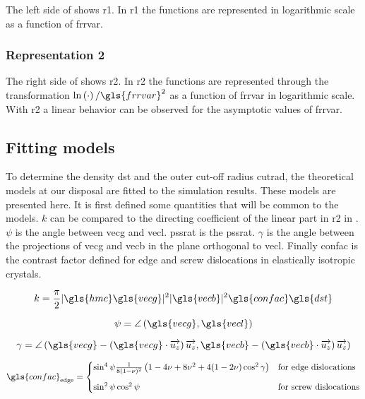 The left side of  shows \gls{r1}.
In \gls{r1} the functions are represented in logarithmic scale as a function of \gls{frrvar}.

\subsubsection{Representation 2}\label{sec:representation-2}

The right side of  shows \gls{r2}.
In \gls{r2} the functions are represented through the transformation \( \ln\left( \cdot \right) / \gls{frrvar}^2 \) as a function of \gls{frrvar} in logarithmic scale.
With \gls{r2} a linear behavior can be observed for the asymptotic values of \gls{frrvar}.

\subsection{Fitting models}

To determine the density \gls{dst} and the outer cut-off radius \gls{cutrad}, the theoretical models at our disposal are fitted to the simulation results.
These models are presented here.
It is first defined some quantities that will be common to the models.
\( k \) can be compared to the directing coefficient of the linear part in \gls{r2} in .
\( \psi \) is the angle between \gls{vecg} and \gls{vecl}.
\gls{pssrat} is the \glsdesc{pssrat}.
\( \gamma \) is the angle between the projections of \gls{vecg} and \gls{vecb} in the plane orthogonal to \gls{vecl}.
Finally \gls{confac} is the contrast factor defined for edge and screw dislocations in elastically isotropic crystals.

\begin{equation}
  k =
    \frac{\pi}{2} | \gls{hmc} \gls{vecg} |^2 | \gls{vecb} |^2 \gls{confac} \gls{dst}
\end{equation}

\begin{equation}
  \psi =
    \angle \left( \gls{vecg}, \gls{vecl} \right)
\end{equation}

\begin{equation}
  \gamma = \angle \left(
    \gls{vecg} - \left( \gls{vecg} \cdot \uz \right) \uz,
    \gls{vecb} - \left( \gls{vecb} \cdot \uz \right) \uz
    \right)
\end{equation}

\begin{equation}\label{eq:contrast-factor}
  \gls{confac}_\mathrm{edge} =
    \begin{cases}
      \sin^4 \psi \frac{1}{8(1-\nu)^2} \left( 1 - 4 \nu + 8 \nu^2 + 4 (1 - 2 \nu) \cos^2 \gamma \right)
      & \text{for edge dislocations} \\[3mm]
      \sin^2 \psi \cos^2 \psi
      & \text{for screw dislocations}
    \end{cases}
\end{equation}

